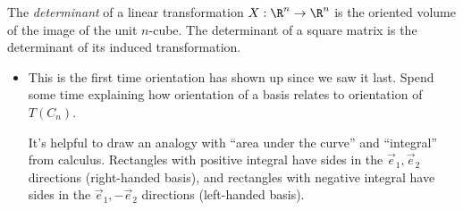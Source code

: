 \documentclass{problemset}
\begin{document}
	\begin{definition}[Determinant]
	The \emph{determinant} of a linear transformation $X:\R^n\to \R^n$ is the
	oriented volume of the image of the unit $n$-cube.  The determinant
	of a square matrix is the determinant of its induced transformation.
	\end{definition}
	\begin{annotation}
		\begin{notes}
			\begin{itemize}
				\item This is the first time orientation has shown up since we saw it last. Spend some
					time explaining how orientation of a basis relates to orientation of $T(C_n)$.

					It's helpful to draw an analogy with ``area under the curve'' and ``integral'' 
					from calculus. Rectangles with positive integral have sides in the $\vec e_1,\vec e_2$
					directions (right-handed basis), and rectangles with negative integral
					have sides in the $\vec e_1,-\vec e_2$ directions (left-handed basis).
			\end{itemize}
		\end{notes}
	\end{annotation}
\end{document}
